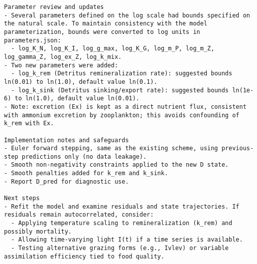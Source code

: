\begin{lstlisting}
Parameter review and updates
- Several parameters defined on the log scale had bounds specified on the natural scale. To maintain consistency with the model parameterization, bounds were converted to log units in parameters.json:
  - log_K_N, log_K_I, log_g_max, log_K_G, log_m_P, log_m_Z, log_gamma_Z, log_ex_Z, log_k_mix.
- Two new parameters were added:
  - log_k_rem (Detritus remineralization rate): suggested bounds ln(0.01) to ln(1.0), default value ln(0.1).
  - log_k_sink (Detritus sinking/export rate): suggested bounds ln(1e-6) to ln(1.0), default value ln(0.01).
- Note: excretion (Ex) is kept as a direct nutrient flux, consistent with ammonium excretion by zooplankton; this avoids confounding of k_rem with Ex.

Implementation notes and safeguards
- Euler forward stepping, same as the existing scheme, using previous-step predictions only (no data leakage).
- Smooth non-negativity constraints applied to the new D state.
- Smooth penalties added for k_rem and k_sink.
- Report D_pred for diagnostic use.

Next steps
- Refit the model and examine residuals and state trajectories. If residuals remain autocorrelated, consider:
  - Applying temperature scaling to remineralization (k_rem) and possibly mortality.
  - Allowing time-varying light I(t) if a time series is available.
  - Testing alternative grazing forms (e.g., Ivlev) or variable assimilation efficiency tied to food quality.
\end{lstlisting}

